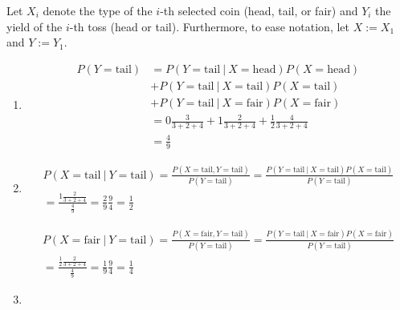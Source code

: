 \begin{solution}

Let $X_i$ denote the type of the $i$-th selected coin (head, tail, or fair) and $Y_i$ the yield of the $i$-th toss (head or tail).
Furthermore, to ease notation, let $X := X_1$ and $Y := Y_1$.

\begin{enumerate}[label = (\alph*)]

    \item

    \begin{align*}
        P(Y = \mathrm{tail})
        & =
        P(Y = \mathrm{tail} ~|~ X = \mathrm{head}) P(X = \mathrm{head}) \\
        & +
        P(Y = \mathrm{tail} ~|~ X = \mathrm{tail}) P(X = \mathrm{tail}) \\
        & +
        P(Y = \mathrm{tail} ~|~ X = \mathrm{fair}) P(X = \mathrm{fair}) \\
        & =
        0 \frac{3}{3 + 2 + 4} + 1 \frac{2}{3 + 2 + 4} + \frac{1}{2} \frac{4}{3 + 2 + 4} \\
        & =
        \frac{4}{9}
    \end{align*}

    \item

    \begin{multline*}
        P(X = \mathrm{tail} ~|~ Y = \mathrm{tail})
        =
        \frac{P(X = \mathrm{tail}, Y = \mathrm{tail})}{P(Y = \mathrm{tail})}
        =
        \frac{P(Y = \mathrm{tail} ~|~ X = \mathrm{tail}) P(X = \mathrm{tail})}{P(Y = \mathrm{tail})} \\
        =
        \frac{1 \frac{2}{3 + 2 + 4}}{\frac{4}{9}}
        =
        \frac{2}{9} \frac{9}{4}
        =
        \frac{1}{2}
    \end{multline*}

    \begin{multline*}
        P(X = \mathrm{fair} ~|~ Y = \mathrm{tail})
        =
        \frac{P(X = \mathrm{fair}, Y = \mathrm{tail})}{P(Y = \mathrm{tail})}
        =
        \frac{P(Y = \mathrm{tail} ~|~ X = \mathrm{fair}) P(X = \mathrm{fair})}{P(Y = \mathrm{tail})} \\
        =
        \frac{\frac{1}{2} \frac{2}{3 + 2 + 4}}{\frac{4}{9}}
        =
        \frac{1}{9} \frac{9}{4}
        =
        \frac{1}{4}
    \end{multline*}

    \item


\end{enumerate}
\end{solution}
